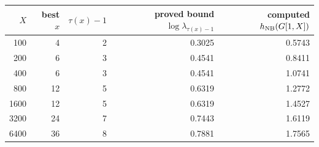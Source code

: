 \begin{tabular}{rrrrr}\toprule $X$ & best $x$ & $\tau(x)-1$ & proved bound $\log\lambda_{\tau(x)-1}$ & computed $h_{\mathrm{NB}}(G[1,X])$\\\midrule
100 & 4 & 2 & 0.3025 & 0.5743\\
200 & 6 & 3 & 0.4541 & 0.8411\\
400 & 6 & 3 & 0.4541 & 1.0741\\
800 & 12 & 5 & 0.6319 & 1.2772\\
1600 & 12 & 5 & 0.6319 & 1.4527\\
3200 & 24 & 7 & 0.7443 & 1.6119\\
6400 & 36 & 8 & 0.7881 & 1.7565\\
\bottomrule\end{tabular}
